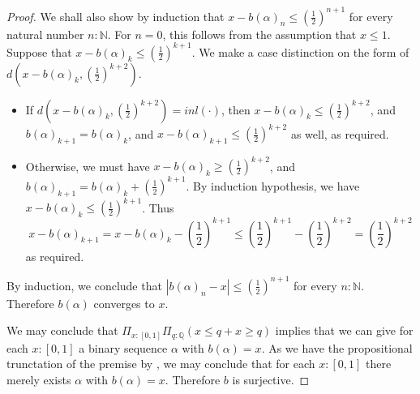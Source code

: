 \begin{proof}
  We shall also show by induction that 
  $ x- b(\alpha)_n \leq (\frac12)^{n+1} $
  for every natural number $n:\mathbb N$. 
%
  For $n = 0$, this follows from the assumption that $x\leq 1$. 
%
  Suppose that $ x- b(\alpha)_k  \leq (\frac12)^{k+1} $. 
  We make a case distinction on the form of $d(x-b(\alpha)_k, (\frac12)^{k+2})$.
  \begin{itemize}
    \item 
      If $d(x-b(\alpha)_k , (\frac12)^{k+2}) = inl(\cdot)$, 
      then $  x-b(\alpha)_k  \leq (\frac12)^{k+2}$, 
      and $b(\alpha)_{k+1} = b(\alpha)_k$, 
      and $x-b(\alpha)_{k+1}  \leq (\frac12)^{k+2}$ as well, 
      as required. 
    \item 
      Otherwise, we must have
      $ x- b(\alpha)_k  \geq (\frac12)^{k+2}$, 
      and $b(\alpha)_{k+1} = b(\alpha)_k + (\frac12)^{k+1}$.
      By induction hypothesis, we have 
      $x-b(\alpha)_k \leq (\frac12)^{k+1}$. 
      Thus \begin{equation}
        x-b(\alpha)_{k+1} = x - b(\alpha)_k - (\frac12)^{k+1}
        \leq (\frac12)^{k+1} - (\frac12)^{k+2} = (\frac12)^{k+2}
      \end{equation}
      as required. 
  \end{itemize}
  
  By induction, we conclude that 
  $ | b(\alpha)_n - x |  \leq (\frac12)^{n+1} $
  for every $n:\mathbb N$. 
  Therefore $b(\alpha)$ converges to $x$. 

  We may conclude that $\Pi_{x:[0,1]} \Pi_{q: \mathbb Q} (x \leq q + x \geq q)$ implies that 
  we can give for each $x: [0,1]$ a binary sequence $\alpha$ with $b(\alpha) = x$. 
  As we have the propositional trunctation of the premise by , 
  we may conclude that for each $x:[0,1]$ there merely exists $\alpha$ with $b(\alpha) = x$. 
  Therefore $b$ is surjective. 
\end{proof}

